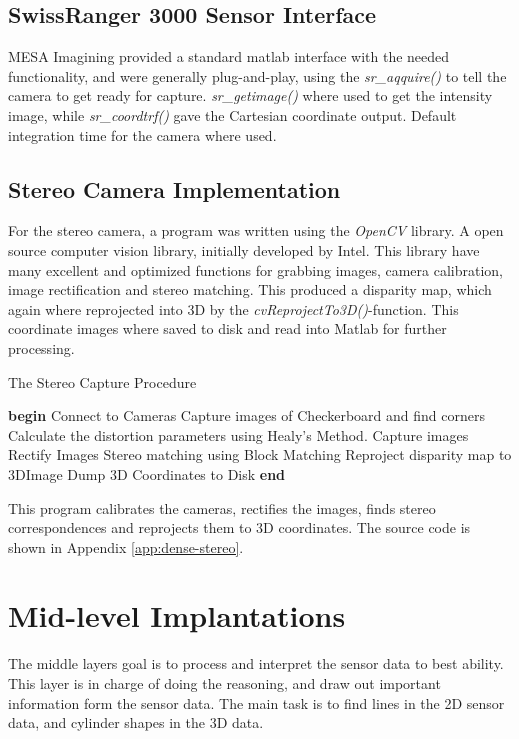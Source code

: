 \subsection{SwissRanger 3000 Sensor Interface}
MESA Imagining provided a standard matlab interface with the needed functionality, and
were generally plug-and-play, using the \emph{sr\_aqquire()} to tell the camera to get
ready for capture. \emph{sr\_getimage()} where used to get the intensity image, while
\emph{sr\_coordtrf()} gave the Cartesian coordinate output. Default integration time for
the camera where used. 

\subsection{Stereo Camera Implementation}
For the stereo camera, a program was written using the \emph{OpenCV} library. A open
source computer vision library, initially developed by Intel. This library have many
excellent and optimized functions for grabbing images, camera calibration, image rectification
and stereo matching. This produced a disparity map, which again where reprojected into 3D
by the \emph{cvReprojectTo3D()}-function. This coordinate images where saved to disk and
read into Matlab for further processing. 

\begin{algorithm}
\caption{The Stereo Capture Procedure}
\label{chap6:alg-stereomatch}
    \begin{algorithmic}
    \STATE \textbf{begin}
    \STATE Connect to Cameras
        \STATE Capture images of Checkerboard and find corners
    \ENDFOR
    \STATE Calculate the distortion parameters using Healy's Method.
        \STATE Capture images
        \STATE Rectify Images
        \STATE Stereo matching using Block Matching 
        \STATE Reproject disparity map to 3DImage
        \STATE Dump 3D Coordinates to Disk
    \ENDWHILE
    \STATE \textbf{end}
    \end{algorithmic}
\end{algorithm}
This program calibrates the cameras, rectifies the images, finds stereo correspondences
and reprojects them to 3D coordinates. The source code is shown in Appendix
\ref{app:dense-stereo}.


\section{Mid-level Implantations}
The middle layers goal is to process and interpret the sensor data to best ability. This
layer is in charge of doing the reasoning, and draw out important information form the
sensor data. The main task is to find lines in the 2D sensor data, and cylinder shapes in
the 3D data. 

